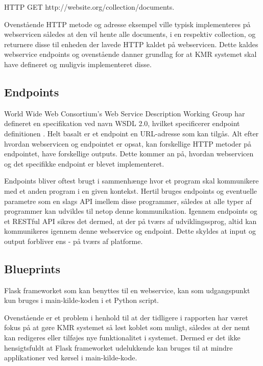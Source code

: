 \begin{appendices}
HTTP GET http://website.org/collection/documents. \newline

Ovenstående HTTP metode og adresse eksempel ville typisk implementeres på webservicen således at den vil hente alle documents, i en respektiv collection, og returnere disse til enheden der lavede HTTP kaldet på webservicen.
Dette kaldes webservice endpoints og ovenstående danner grundlag for at KMR systemet skal have defineret og muligvis implementeret disse. \\

\pagebreak
\subsection{Endpoints}

World Wide Web Consortium's Web Service Description Working Group har defineret en specifikation ved navn WSDL 2.0, hvilket specificerer endpoint definitionen \cite{WSDL}. \newline
Helt basalt er et endpoint en URL-adresse som kan tilgås. Alt efter hvordan webservicen og endpointet er opsat, kan forskellige HTTP metoder på endpointet, have forskellige outputs. Dette kommer an på, hvordan webservicen og det specifikke endpoint er blevet implementeret.

Endpoints bliver oftest brugt i sammenhænge hvor et program skal kommunikere med et anden program i en given kontekst. Hertil bruges endpoints og eventuelle parametre som en slags API imellem disse programmer, således at alle typer af programmer kan udvikles til netop denne kommunikation. Igennem endpoints og et RESTful API sikres det dermed, at der på tværs af udviklingssprog, altid kan kommunikeres igennem denne webservice og endpoint. Dette skyldes at input og output forbliver ens - på tværs af platforme. 

\subsection{Blueprints}

Flask frameworket som kan benyttes til en webservice, kan som udgangspunkt kun bruges i main-kilde-koden i et Python script. 

Ovenstående er et problem i henhold til at der tidligere i rapporten har været fokus på at gøre KMR systemet så løst koblet som muligt, således at der nemt kan redigeres eller tilføjes nye funktionalitet i systemet. Dermed er det ikke hensigtsfuldt at Flask frameworket udelukkende kan bruges til at mindre applikationer ved kørsel i main-kilde-kode.


\end{appendices}
